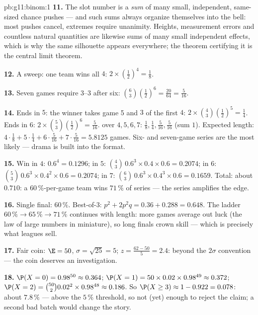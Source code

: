 \begin{solution}{pb:g11:binom:1}
\textbf{11.} The slot number is a \emph{sum} of many small,
independent, same-sized chance pushes --- and such sums always
organize themselves into the bell: most pushes cancel, extremes
require unanimity. Heights, measurement errors and countless
natural quantities are likewise sums of many small independent
effects, which is why the same silhouette appears everywhere;
the theorem certifying it is the central limit theorem.

\textbf{12.} A sweep: one team wins all $4$:
$2 \times \left(\frac12\right)^4 = \frac18$.

\textbf{13.} Seven games require $3$--$3$ after six:
$\binom63 \left(\frac12\right)^6 = \frac{20}{64} =
\frac{5}{16}$.

\textbf{14.} Ends in $5$: the winner takes game 5 and $3$ of
the first $4$:
$2 \times \binom43 \left(\frac12\right)^5 = \frac14$. Ends in
$6$: $2 \times \binom53 \left(\frac12\right)^6 = \frac{5}{16}$.
 over $4, 5, 6, 7$:
$\frac18, \frac14, \frac{5}{16}, \frac{5}{16}$ (sum $1$).
Expected length: $4 \cdot \frac18 + 5 \cdot \frac14 + 6 \cdot
\frac{5}{16} + 7 \cdot \frac{5}{16} = 5.8125$ games. Six- and
seven-game series are the most likely --- drama is built into
the format.

\textbf{15.} Win in $4$: $0.6^4 = 0.1296$; in $5$:
$\binom43\,0.6^3 \times 0.4 \times 0.6 = 0.2074$; in $6$:
$\binom53\,0.6^3 \times 0.4^2 \times 0.6 = 0.2074$; in $7$:
$\binom63\,0.6^3 \times 0.4^3 \times 0.6 = 0.1659$. Total:
about $0.710$: a $60\,\%$-per-game team wins $71\,\%$ of
series --- the series amplifies the edge.

\textbf{16.} Single final: $60\,\%$. Best-of-3:
$p^2 + 2p^2 q = 0.36 + 0.288 = 0.648$. The ladder
$60\,\% \to 65\,\% \to 71\,\%$ continues with length: more
games average out luck (the law of large numbers in miniature),
so long finals crown skill --- which is precisely what leagues
sell.

\textbf{17.} Fair coin: $\E = 50$, $\sigma = \sqrt{25} = 5$;
$z = \frac{62 - 50}{5} = 2.4$: beyond the $2\sigma$
convention --- the coin deserves an investigation.

\textbf{18.} $\P(X = 0) = 0.98^{50} \approx 0.364$;
$\P(X = 1) = 50 \times 0.02 \times 0.98^{49} \approx 0.372$;
$\P(X = 2) = \binom{50}{2} 0.02^2 \times 0.98^{48} \approx
0.186$. So $\P(X \geq 3) \approx 1 - 0.922 = 0.078$: about
$7.8\,\%$ --- above the $5\,\%$ threshold, so not (yet)
enough to reject the claim; a second bad batch would change
the story.


\end{solution}
